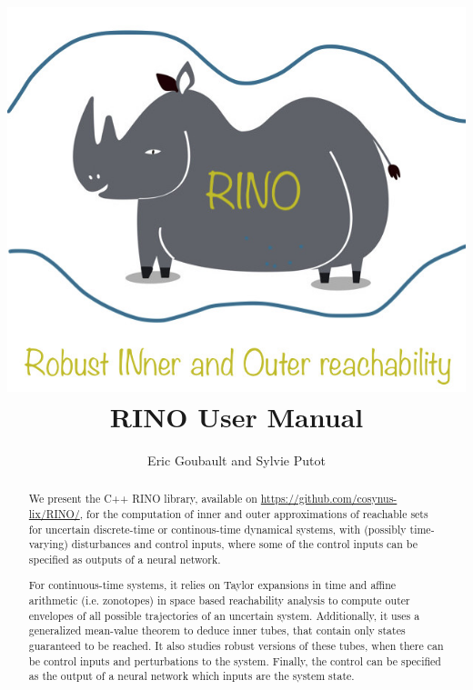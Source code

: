 \documentclass{article}
\title{\includegraphics[scale=0.4]{rino2.jpg} \\  \Huge{RINO User Manual}  }
\author{Eric Goubault and Sylvie Putot}
\affil{LIX, Ecole Polytechnique, CNRS and Institut Polytechnique de Paris,  \\91128
Palaiseau, France \\ name.surname@polytechnique.edu}
\begin{document}
\maketitle



\begin{abstract}
We present the C++ RINO library, available on \url{https://github.com/cosynus-lix/RINO/},  for the computation of inner and outer approximations of reachable sets for uncertain discrete-time or continous-time dynamical systems, with (possibly time-varying) disturbances and control inputs, where some of the control inputs can be specified as outputs of a neural network.

For continuous-time systems, it relies on Taylor expansions in time and affine arithmetic (i.e. zonotopes) in space based reachability analysis to compute outer envelopes of all possible trajectories of an uncertain system. Additionally, it uses a generalized mean-value theorem to deduce inner tubes, that contain only states guaranteed to be reached. It also studies robust versions of these tubes, when there can be control inputs and perturbations to the system. Finally, the control can be specified as the output of a neural network which inputs are the system state.
\end{abstract}

\end{document}
